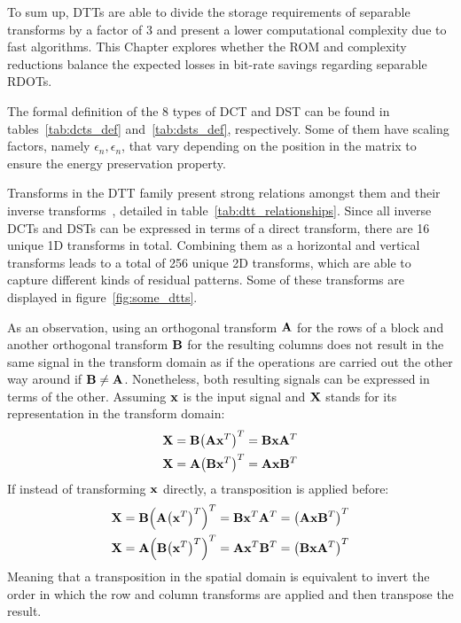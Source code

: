 \documentclass[11pt,a4paper,openright,twoside]{book}
\numberwithin{equation}{section} %
\numberwithin{figure}{section} %
\numberwithin{table}{section} %
\begin{document}
To sum up, \acp{DTT} are able to divide the storage requirements of separable
transforms by a factor of 3 and present a lower computational complexity due
to fast algorithms.
This Chapter explores whether the \acs{ROM} and complexity reductions balance
the expected losses in bit-rate savings regarding separable \acp{RDOT}.

The formal definition of the 8 types of \ac{DCT} and \ac{DST} can be found in
tables~\ref{tab:dcts_def} and~\ref{tab:dsts_def}, respectively.
Some of them have scaling factors, namely $\epsilon_n, \epsilon_n$, that vary
depending on the position in the matrix to ensure the energy preservation
property.

Transforms in the \ac{DTT} family present strong relations amongst them and
their inverse transforms~\cite{reznik-13-relationship-dct-dst,
saxena-13-fast-transforms-intra-coding}, detailed in
table~\ref{tab:dtt_relationships}.
Since all inverse \acsp{DCT} and \acsp{DST} can be expressed in terms of a
direct transform, there are 16 unique 1D transforms in total.
Combining them as a horizontal and vertical transforms leads to a total of 256
unique 2D transforms, which are able to capture different kinds of residual
patterns.
Some of these transforms are displayed in figure~\ref{fig:some_dtts}.

As an observation, using an orthogonal transform $\mathbf{A}$ for the rows of a block
and another orthogonal transform $\mathbf{B}$ for the resulting columns does not
result in the same signal in the transform domain as if the operations are
carried out the other way around if $\mathbf{B}\neq\mathbf{A}$.
Nonetheless, both resulting signals can be expressed in terms of the other.
Assuming $\mathbf{x}$ is the input signal and $\mathbf{X}$ stands for its representation in
the transform domain:
\begin{align}
	\mathbf{X} = \mathbf{B}{\left(\mathbf{A}\mathbf{x}^T\right)}^T = \mathbf{B} \mathbf{x} \mathbf{A}^T \\
	\mathbf{X} = \mathbf{A}{\left(\mathbf{B}\mathbf{x}^T\right)}^T = \mathbf{A} \mathbf{x} \mathbf{B}^T
\end{align}
If instead of transforming $\mathbf{x}$ directly, a transposition is applied before:
\begin{align}
	\mathbf{X} = \mathbf{B}{\left(\mathbf{A}{\left(\mathbf{x}^T\right)}^T\right)}^T = \mathbf{B} \mathbf{x}^T \mathbf{A}^T =
	{\left(\mathbf{A}\mathbf{x}\mathbf{B}^T\right)}^T\\
	\mathbf{X} = \mathbf{A}{\left(\mathbf{B}{\left(\mathbf{x}^T\right)}^T\right)}^T = \mathbf{A} \mathbf{x}^T \mathbf{B}^T =
	{\left(\mathbf{B}\mathbf{x}\mathbf{A}^T\right)}^T
\end{align}
Meaning that a transposition in the spatial domain is equivalent to invert the
order in which the row and column transforms are applied and then transpose
the result.
\end{document}
